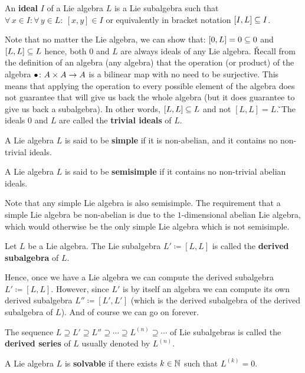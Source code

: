 \bd [Ideal]
An \textbf{ideal} $I$ of a Lie algebra $L$ is a Lie subalgebra such that $\forall \, x\in I : \forall \, y\in L : \
[x,y]\in I$ or equivalently in bracket notation $[I,L]\subseteq I$.
\ed

Note that no matter the Lie algebra, we can show that: $[0, L] = 0 \subseteq 0$ and $[L, L] \subseteq L$ hence, both $0$ and $L$
are always ideals of any Lie algebra. \v

Recall from the definition of an algebra (any algebra) that the operation (or product) of the algebra $\bullet \colon
A\times A \to A$ is a bilinear map with no need to be surjective. This means that applying the operation to every
possible element of the algebra does not guarantee that will give us back the whole algebra (but it does guarantee to
give us back a subalgebra). In other words, $[L, L] \subseteq L$ and not $[L, L] = L$. \v

The ideals $0$ and $L$ are called the \textbf{trivial ideals} of $L$.
\ed

A Lie algebra $L$ is said to be \textbf{simple} if it is non-abelian, and it contains no non-trivial ideals.
\ed

A Lie algebra $L$ is said to be \textbf{semisimple} if it contains no non-trivial abelian ideals.
\ed

Note that any simple Lie algebra is also semisimple. The requirement that a simple Lie algebra be non-abelian is due
to the $1$-dimensional abelian Lie algebra, which would otherwise be the only simple Lie algebra which is not
semisimple.

Let $L$ be a Lie algebra. The Lie subalgebra $L' \coloneqq [L,L]$ is called the \textbf{derived subalgebra} of $L$.
\ed

Hence, once we have a Lie algebra we can compute the derived subalgebra $L' \coloneqq [L,L]$. However, since $L'$ is
by itself an algebra we can compute its own derived subalgebra $L'' \coloneqq [L',L']$ (which is the derived
subalgebra of the derived subalgebra of $L$). And of course we can go on forever.

The sequence $L \supseteq L' \supseteq L'' \supseteq \cdots \supseteq L^{(n) } \supseteq \cdots$ of Lie subalgebras
is called the \textbf{derived series} of $L$ usually denoted by $L^{(n)}$.
\ed

A Lie algebra $L$ is \textbf{solvable} if there exists $k\in \mathbb{N}$ such that $L^{(k)}=0$.
\ed

